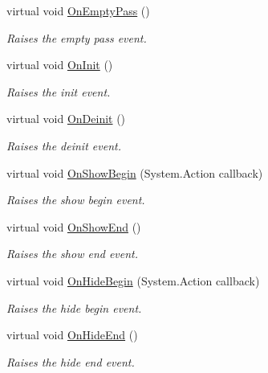 \begin{DoxyCompactItemize}
virtual void \hyperlink{class_unity_engine_1_1_u_i_1_1_windows_1_1_window_base_a4ff7f30ad10cbb64111894374443d7f1}{On\+Empty\+Pass} ()
\begin{DoxyCompactList}\small\item\em Raises the empty pass event. \end{DoxyCompactList}\item 
virtual void \hyperlink{class_unity_engine_1_1_u_i_1_1_windows_1_1_window_base_a563afef8016deb1af1c04e3e2f479bbf}{On\+Init} ()
\begin{DoxyCompactList}\small\item\em Raises the init event. \end{DoxyCompactList}\item 
virtual void \hyperlink{class_unity_engine_1_1_u_i_1_1_windows_1_1_window_base_ae2b1948daf5cc1550c7c08b1b07a7a74}{On\+Deinit} ()
\begin{DoxyCompactList}\small\item\em Raises the deinit event. \end{DoxyCompactList}\item 
virtual void \hyperlink{class_unity_engine_1_1_u_i_1_1_windows_1_1_window_base_a607752def34c9c15b10b3332cb0b6d24}{On\+Show\+Begin} (System.\+Action callback)
\begin{DoxyCompactList}\small\item\em Raises the show begin event. \end{DoxyCompactList}\item 
virtual void \hyperlink{class_unity_engine_1_1_u_i_1_1_windows_1_1_window_base_ab93d409e0efb521d9c3699a24d95ac83}{On\+Show\+End} ()
\begin{DoxyCompactList}\small\item\em Raises the show end event. \end{DoxyCompactList}\item 
virtual void \hyperlink{class_unity_engine_1_1_u_i_1_1_windows_1_1_window_base_aa3a09eb58f08f2a288ac70c54284cf95}{On\+Hide\+Begin} (System.\+Action callback)
\begin{DoxyCompactList}\small\item\em Raises the hide begin event. \end{DoxyCompactList}\item 
virtual void \hyperlink{class_unity_engine_1_1_u_i_1_1_windows_1_1_window_base_acc0ee8819895df9969ab0644771bc692}{On\+Hide\+End} ()
\begin{DoxyCompactList}\small\item\em Raises the hide end event. \end{DoxyCompactList}\end{DoxyCompactItemize}
